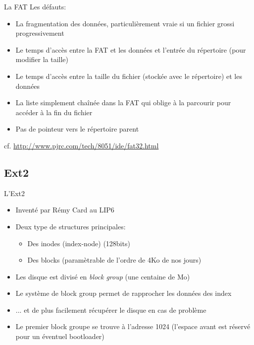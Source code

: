 \begin{frame}[fragile=singleslide]{La FAT}
  Les défauts:
  \begin{itemize}
  \item  La fragmentation  des données,  particulièrement vraie  si un
    fichier grossi progressivement
  \item Le  temps d'accès entre la  FAT et les données  et l'entrée du
    répertoire (pour modifier la taille)
  \item Le temps  d'accès entre la taille du  fichier (stockée avec le
    répertoire) et les données
  \item  La liste  simplement  chaînée dans  la  FAT qui  oblige à  la
    parcourir pour accéder à la fin du fichier
  \item Pas de pointeur vers le répertoire parent
  \end{itemize}
  cf. \url{http://www.pjrc.com/tech/8051/ide/fat32.html}
\end{frame}

\subsection{Ext2}

\begin{frame}[fragile=singleslide]{L'Ext2}
  \begin{itemize}
  \item Inventé par Rémy Card au LIP6
  \item Deux type de structures principales:
    \begin{itemize}
    \item Des inodes (index-node) (128bits)
    \item Des blocks (paramètrable de l'ordre de 4Ko de nos jours)
    \end{itemize}
  \item Les disque  est divisé en \emph{block group}  (une centaine de
    Mo)
  \item Le système de block group permet de rapprocher les données des
    index
  \item  ... et  de  plus facilement  récupérer  le disque  en cas  de
    problème
  \item Le premier  block groupe se trouve à  l'adresse 1024 (l'espace
    avant est réservé pour un éventuel bootloader)
  \end{itemize}
\end{frame}

